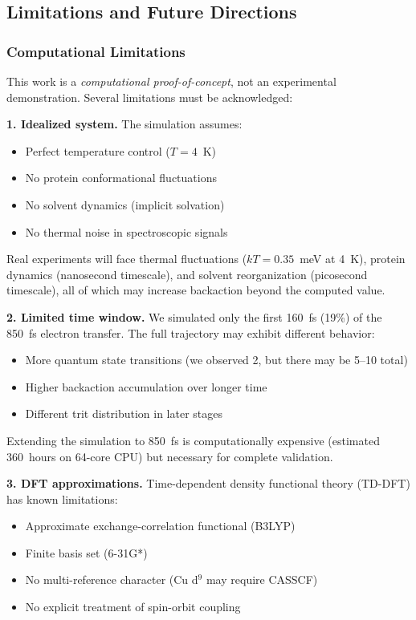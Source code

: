 \documentclass[twocolumn,10pt]{article}
\begin{document}
\subsection{Limitations and Future Directions}

\subsubsection{Computational Limitations}

This work is a \textit{computational proof-of-concept}, not an experimental 
demonstration. Several limitations must be acknowledged:

\textbf{1. Idealized system.} The simulation assumes:
%
\begin{itemize}
\item Perfect temperature control ($T = 4$~K)
\item No protein conformational fluctuations
\item No solvent dynamics (implicit solvation)
\item No thermal noise in spectroscopic signals
\end{itemize}

Real experiments will face thermal fluctuations ($kT = 0.35$~meV at 4~K), 
protein dynamics (nanosecond timescale), and solvent reorganization (picosecond 
timescale), all of which may increase backaction beyond the computed value.

\textbf{2. Limited time window.} We simulated only the first 160~fs (19\%) of 
the 850~fs electron transfer. The full trajectory may exhibit different behavior:
%
\begin{itemize}
\item More quantum state transitions (we observed 2, but there may be 5--10 total)
\item Higher backaction accumulation over longer time
\item Different trit distribution in later stages
\end{itemize}

Extending the simulation to 850~fs is computationally expensive (estimated 
360~hours on 64-core CPU) but necessary for complete validation.

\textbf{3. DFT approximations.} Time-dependent density functional theory (TD-DFT) 
has known limitations:
%
\begin{itemize}
\item Approximate exchange-correlation functional (B3LYP)
\item Finite basis set (6-31G*)
\item No multi-reference character (Cu d$^9$ may require CASSCF)
\item No explicit treatment of spin-orbit coupling
\end{itemize}
\end{document}
